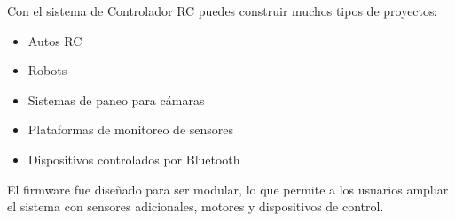 Con el sistema de Controlador RC puedes construir muchos tipos de proyectos:

\begin{itemize}
    \item Autos RC
    \item Robots
    \item Sistemas de paneo para cámaras
    \item Plataformas de monitoreo de sensores
    \item Dispositivos controlados por Bluetooth
\end{itemize}

El firmware fue diseñado para ser modular, lo que permite a los usuarios ampliar el sistema con sensores adicionales, motores y dispositivos de control.